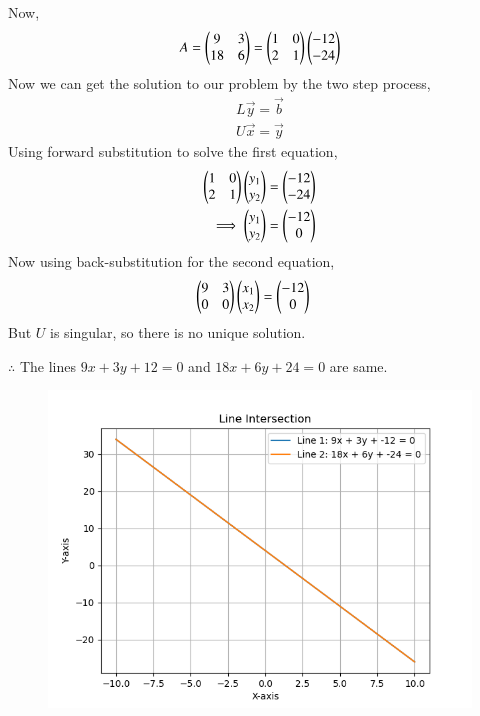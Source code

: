 \documentclass[journal]{IEEEtran}
\numberwithin{equation}{enumi}
\numberwithin{figure}{enumi}
\begin{document}
\begin{enumerate}
Now,
\begin{align}
    A = \begin{pmatrix}9&3\\18&6\end{pmatrix}= \begin{pmatrix}1 & 0\\ 2 & 1\end{pmatrix}\begin{pmatrix}-12\\-24\end{pmatrix}
\end{align}
Now we can get the solution to our problem by the two step process,
\begin{align}
    L\vec{y} = \vec{b}\\
    U\vec{x} = \vec{y}
\end{align}
Using forward substitution to solve the first equation,
\begin{align}
     \begin{pmatrix}1 & 0\\ 2 & 1\end{pmatrix}\begin{pmatrix}y_1 \\ y_2\end{pmatrix} &= \begin{pmatrix}-12\\-24\end{pmatrix}\\
    \implies \begin{pmatrix}y_1 \\ y_2\end{pmatrix} &= \begin{pmatrix}-12 \\ 0\end{pmatrix}\\
\end{align}
Now using back-substitution for the second equation,
\begin{align}
    \begin{pmatrix}9&3\\0&0\end{pmatrix} \begin{pmatrix}x_1 \\ x_2\end{pmatrix} &=  \begin{pmatrix}-12\\0\end{pmatrix}
\end{align}
But $U$ is singular, so there is no unique solution.

$\therefore$ The lines $9x + 3y + 12 = 0 $ and $18x + 6y + 24 = 0 $  are same.

\end{enumerate}
\begin{figure}[h!]
   \centering
   \includegraphics[width=0.7\linewidth]{figs/Figure_1.png}
\end{figure}
\end{document}
